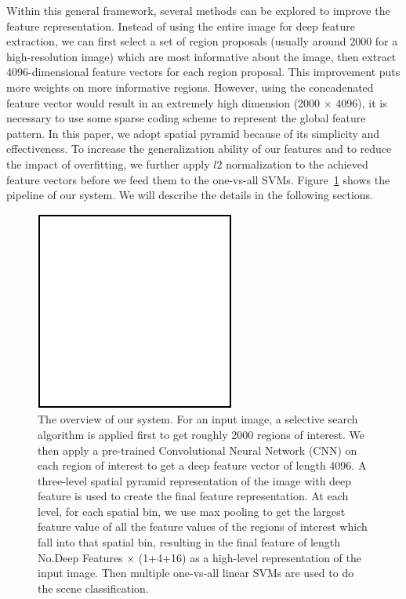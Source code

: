 Within this general framework, several methods can be explored to improve the
feature representation. Instead of using the entire image for deep feature
extraction, we can first select a set of region proposals (usually around 2000
for a high-resolution image) which are most informative about the image, then
extract 4096-dimensional feature vectors for each region proposal. This
improvement puts more weights on more informative regions. However, using the
concadenated feature vector would result in an extremely high dimension (2000
$\times$ 4096), it is necessary to use some sparse coding scheme to represent
the global feature pattern. In this paper, we adopt spatial pyramid because of
its simplicity and effectiveness. To increase the generalization ability of our
features and to reduce the impact of overfitting, we further apply $l2$
normalization to the achieved feature vectors before we feed them to the
one-vs-all SVMs. Figure~\ref{fig:system_overview} shows the pipeline of our
system. We will describe the details in the following sections.

\begin{figure}[ht]
  \centering
  \includegraphics[scale=0.8]{img/demo.pdf}
  \centering
  \caption{The overview of our system. For an input image, a selective search
  algorithm is applied first to get roughly 2000 regions of interest. We then
  apply a pre-trained Convolutional Neural Network (CNN) on each region of
  interest to get a deep feature vector of length 4096. A three-level spatial
  pyramid representation of the image with deep feature is used to create the
  final feature representation. At each level, for each spatial bin, we use max
  pooling to get the largest feature value of all the feature values of the
  regions of interest which fall into that spatial bin, resulting in the final
  feature of length No.Deep Features $\times$ (1+4+16) as a high-level
  representation of the input image. Then multiple one-vs-all linear SVMs are
  used to do the scene classification.} \label{fig:system_overview}
\end{figure}


